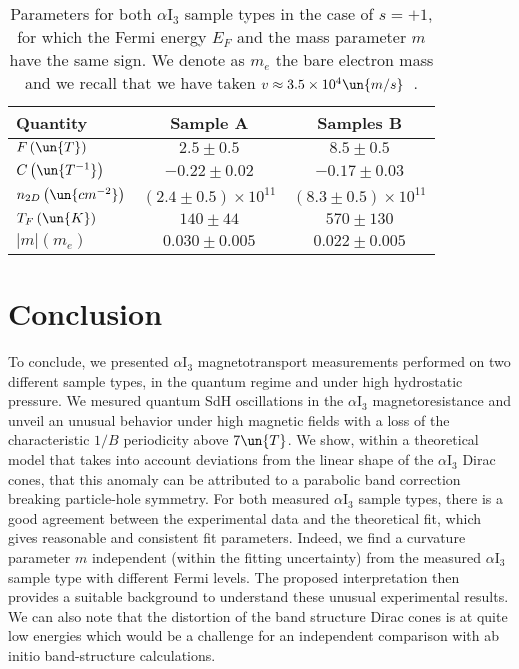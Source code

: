 \documentclass[doublecol]{epl2}
\begin{document}
\begin{table}
\caption{Parameters for both $\alpha$I$_{3}$ sample types in the case of $s=+1$, for which the Fermi energy $E_{F}$ and the mass parameter $m$ have the same sign. We denote as $m_e$ the bare electron mass and we recall that we have taken $v\approx 3.5\times 10^4\un{m/s}$~\cite{FermiVelocityAlpha}.}
\label{Table}
\begin{center}
\begin{tabular}{lcc}
\hline\hline Quantity & Sample A & Samples B\\[0.1cm]\hline
$F \left(\un{T}\right)$ & $2.5\pm 0.5$ & $8.5\pm 0.5$\\[0.1cm]
$C \left(\un{T^{-1}}\right)$ & $-0.22\pm 0.02$ & $-0.17\pm 0.03$\\[0.1cm]
$n_{2D} \left(\un{cm^{-2}}\right)$ & $(2.4\pm0.5)\times10^{11}$ & $(8.3\pm0.5)\times10^{11}$\\[0.1cm]
$T_{F} \left(\un{K}\right)$ & $140\pm44$ & $570\pm130$\\[0.1cm]
$\left|m\right| \left(m_{e}\right)$ & $0.030\pm0.005$ & $0.022\pm0.005$\\\hline\hline
\end{tabular}
\end{center}
\end{table}


\section{Conclusion}
To conclude, we presented $\alpha$I$_{3}$ magnetotransport measurements performed on two different sample types, in the quantum regime and under high hydrostatic pressure. 
We mesured quantum SdH oscillations in the $\alpha$I$_{3}$ magnetoresistance and unveil an unusual behavior under high magnetic fields with a loss of the
characteristic $1/B$ periodicity above $7\un{T}$. 
We show, within a theoretical model that takes into account deviations from the linear shape of the $\alpha$I$_{3}$ Dirac cones, 
that this anomaly can be attributed to a parabolic band correction breaking particle-hole symmetry.  
For both measured $\alpha$I$_{3}$ sample types, there is a good agreement between the experimental data 
and the theoretical fit, which gives reasonable and consistent fit parameters. Indeed, we find a curvature parameter $m$ independent (within the fitting uncertainty) 
from the measured $\alpha$I$_{3}$ sample type with different Fermi levels. The proposed interpretation then provides a suitable background to understand these unusual 
experimental results. We can also note that the distortion of the band structure Dirac cones is at quite low energies which would be a challenge for an independent 
comparison with ab initio band-structure calculations.
\end{document}

